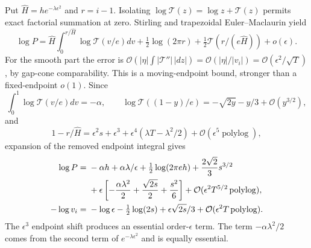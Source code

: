 \documentclass[11pt]{article}
\theoremstyle{remark}\newtheorem{remark}[theorem]{Remark}
\newcommand{\OO}{\mathcal O}
\newcommand{\TT}{\mathcal T}
\begin{document}
Put $\widehat H=he^{-\lambda\epsilon^2}$ and $r=i-1$. Isolating
$\log\TT(z)=\log z+\TT(z)$ permits exact factorial summation at zero.
Stirling and trapezoidal Euler--Maclaurin yield
\begin{equation}\label{xtw:frac:eq:productEM}
 \log P=\widehat H\int_0^{r/\widehat H}\log\TT(v/e)dv
      +\tfrac12\log(2\pi r)+\tfrac12\TT(r/(e\widehat H))+o(\epsilon).
\end{equation}
For the smooth part the error is
$\OO(|\eta|\int|\TT''|\,|dz|)=\OO(|\eta|/|v_i|)
=\OO(\epsilon^2/\sqrt T)$, by gap-cone comparability.
This is a moving-endpoint bound, stronger than a fixed-endpoint $o(1)$.
Since
\[
 \int_0^1\log\TT(v/e)dv=-\alpha,\qquad
 \log\TT((1-y)/e)=-\sqrt{2y}-y/3+\OO(y^{3/2}),
\]
and
\[
 1-r/\widehat H=\epsilon^2s+\epsilon^3
      +\epsilon^4(\lambda T-\lambda^2/2)+\OO(\epsilon^5\operatorname{polylog}),
\]
expansion of the removed endpoint integral gives
\begin{align}
 \log P={}&-\alpha h+\alpha\lambda/\epsilon
    +\tfrac12\log(2\pi eh)+\frac{2\sqrt2}{3}s^{3/2}\notag\\
 &+\epsilon\left[-\frac{\alpha\lambda^2}{2}
                    +\frac{\sqrt{2s}}2+\frac{s^2}{6}\right]
    +\OO(\epsilon^2T^{5/2}\operatorname{polylog}),\label{xtw:frac:eq:productexp}\\
 -\log v_i={}&-\log\epsilon-\tfrac12\log(2s)
                    +\epsilon\sqrt{2s}/3
                    +\OO(\epsilon^2T\operatorname{polylog}).\label{xtw:frac:eq:gapexp}
\end{align}
The $\epsilon^3$ endpoint shift produces an essential order-$\epsilon$
term. The term $-\alpha\lambda^2/2$ comes from the second term of
$e^{-\lambda\epsilon^2}$ and is equally essential.
\end{document}
